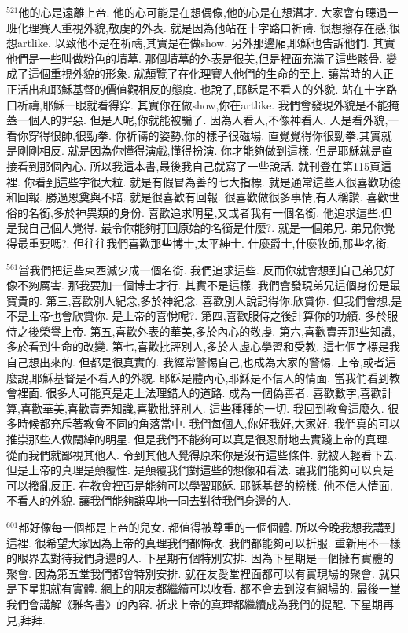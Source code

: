 \documentclass{book}
\begin{document}
$^{521}$他的心是遠離上帝.
他的心可能是在想偶像,他的心是在想潛才.
大家會有聽過一班化理賽人重視外貌,敬虔的外表.
就是因為他站在十字路口祈禱.
很想擦存在感,很想artlike.
以致他不是在祈禱,其實是在做show.
另外那邊廂,耶穌也告訴他們.
其實他們是一些叫做粉色的墳墓.
那個墳墓的外表是很美,但是裡面充滿了這些骸骨.
變成了這個重視外貌的形象.
就顛覽了在化理賽人他們的生命的至上.
讓當時的人正正活出和耶穌基督的價值觀相反的態度.
也說了,耶穌是不看人的外貌.
站在十字路口祈禱,耶穌一眼就看得穿.
其實你在做show,你在artlike.
我們會發現外貌是不能掩蓋一個人的罪惡.
但是人呢,你就能被騙了.
因為人看人,不像神看人.
人是看外貌,一看你穿得很帥,很勁拳.
你祈禱的姿勢,你的樣子很磁場.
直覺覺得你很勁拳,其實就是剛剛相反.
就是因為你懂得演戲,懂得扮演.
你才能夠做到這樣.
但是耶穌就是直接看到那個內心.
所以我這本書,最後我自己就寫了一些說話.
就刊登在第115頁這裡.
你看到這些字很大粒.
就是有假冒為善的七大指標.
就是通常這些人很喜歡功德和回報.
勝過恩奠與不賠.
就是很喜歡有回報.
很喜歡做很多事情,有人稱讚.
喜歡世俗的名銜,多於神異類的身份.
喜歡追求明星,又或者我有一個名銜.
他追求這些,但是我自己個人覺得.
最令你能夠打回原始的名銜是什麼?.
就是一個弟兄.
弟兄你覺得最重要嗎?.
但往往我們喜歡那些博士,太平紳士.
什麼爵士,什麼牧師,那些名銜.

$^{561}$當我們把這些東西減少成一個名銜.
我們追求這些.
反而你就會想到自己弟兄好像不夠厲害.
那我要加一個博士才行.
其實不是這樣.
我們會發現弟兄這個身份是最寶貴的.
第三,喜歡別人紀念,多於神紀念.
喜歡別人說記得你,欣賞你.
但我們會想,是不是上帝也會欣賞你.
是上帝的喜悅呢?.
第四,喜歡服侍之後計算你的功績.
多於服侍之後榮譽上帝.
第五,喜歡外表的華美,多於內心的敬虔.
第六,喜歡賣弄那些知識,多於看到生命的改變.
第七,喜歡批評別人,多於人虛心學習和受教.
這七個字標是我自己想出來的.
但都是很真實的.
我經常警惕自己,也成為大家的警惕.
上帝,或者這麼說,耶穌基督是不看人的外貌.
耶穌是體內心,耶穌是不信人的情面.
當我們看到教會裡面.
很多人可能真是走上法理錯人的道路.
成為一個偽善者.
喜歡數字,喜歡計算,喜歡華美,喜歡賣弄知識,喜歡批評別人.
這些種種的一切.
我回到教會這麼久.
很多時候都充斥著教會不同的角落當中.
我們每個人,你好我好,大家好.
我們真的可以推崇那些人做闊綽的明星.
但是我們不能夠可以真是很忍耐地去實踐上帝的真理.
從而我們就鄙視其他人.
令到其他人覺得原來你是沒有這些條件.
就被人輕看下去.
但是上帝的真理是顛覆性.
是顛覆我們對這些的想像和看法.
讓我們能夠可以真是可以撥亂反正.
在教會裡面是能夠可以學習耶穌.
耶穌基督的榜樣.
他不信人情面,不看人的外貌.
讓我們能夠謙卑地一同去對待我們身邊的人.

$^{601}$都好像每一個都是上帝的兒女.
都值得被尊重的一個個體.
所以今晚我想我講到這裡.
很希望大家因為上帝的真理我們都悔改.
我們都能夠可以折服.
重新用不一樣的眼界去對待我們身邊的人.
下星期有個特別安排.
因為下星期是一個擁有實體的聚會.
因為第五堂我們都會特別安排.
就在友愛堂裡面都可以有實現場的聚會.
就只是下星期就有實體.
網上的朋友都繼續可以收看.
都不會去到沒有網場的.
最後一堂我們會講解《雅各書》的內容.
祈求上帝的真理都繼續成為我們的提醒.
下星期再見,拜拜.
\newpage
\end{document}
